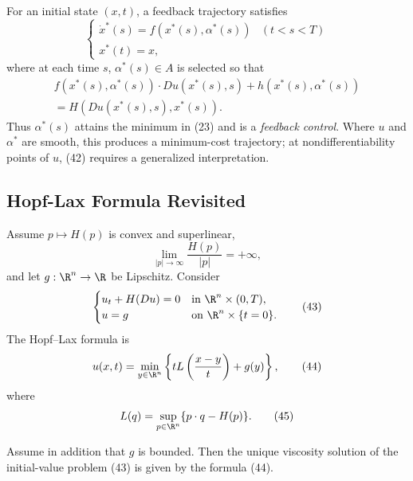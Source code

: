 \begin{remark}
\label{rem:design-of-optimal-controls}
For an initial state $(x,t)$, a feedback trajectory satisfies
\[
\begin{cases} \dot{x}^*(s) = f(x^*(s), \alpha^*(s)) & (t < s < T) \\ x^*(t) = x, \end{cases}
\tag{41}
\]
where at each time $s$, $\alpha^*(s) \in A$ is selected so that
\[
\begin{aligned}
f(x^*(s), \alpha^*(s)) \cdot Du(x^*(s), s) + h(x^*(s), \alpha^*(s)) \\
= H(Du(x^*(s), s), x^*(s)).
\end{aligned}
\tag{42}
\]
Thus $\alpha^*(s)$ attains the minimum in (23) and is a \textit{feedback control}. Where $u$ and $\alpha^*$ are smooth, this produces a minimum-cost trajectory; at nondifferentiability points of $u$, (42) requires a generalized interpretation.
\end{remark}

\subsection{Hopf-Lax Formula Revisited}

Assume $p\mapsto H(p)$ is convex and superlinear,
\[
\lim_{|p|\to\infty}\frac{H(p)}{|p|}=+\infty,
\]
and let $g:\R^n\to\R$ be Lipschitz. Consider
\[
\begin{cases}
u_t+H(Du)=0 & \text{in }\R^n\times(0,T),\\
u=g & \text{on }\R^n\times\{t=0\}.
\end{cases}
\tag{43}
\]
The Hopf--Lax formula is
\[
u(x,t)=\min_{y\in\R^n}\left\{tL\left(\frac{x-y}{t}\right)+g(y)\right\},
\tag{44}
\]
where
\[
L(q)=\sup_{p\in\R^n}\{p\cdot q-H(p)\}.
\tag{45}
\]

\begin{theorem}
\label{thm:hopf-lax-formula-viscosity-solution}
Assume in addition that $g$ is bounded. Then the unique viscosity solution of the initial-value problem (43) is given by the formula (44).
\end{theorem}

